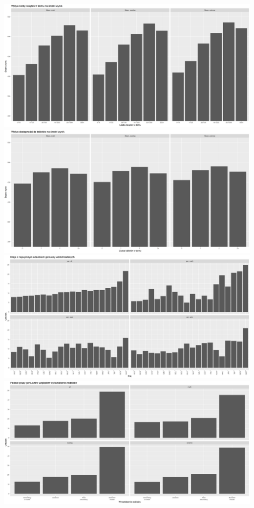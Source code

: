 \documentclass[]{article}
\begin{document}
\includegraphics[width=1\linewidth]{./wykresy_pytania_kwestionariusz/liczba_ksiazek}
\includegraphics[width=1\linewidth]{./wykresy_pytania_kwestionariusz/liczba_tabletow}
\includegraphics[width=1\linewidth]{./wykresy_pytania_kwestionariusz/odsetek_geniuszy_kraje}
\includegraphics[width=1\linewidth]{./wykresy_pytania_kwestionariusz/rozklad_geeks_na_wyksztalcenie}
\end{document}
